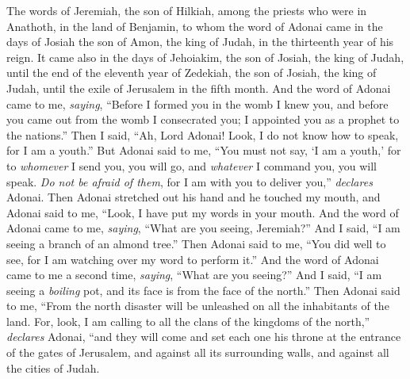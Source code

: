 
\begin{biblechapter} %
 The words of Jeremiah, the son of Hilkiah, among the priests who were in Anathoth, in the land of Benjamin,
\verse to whom the word of Adonai came in the days of Josiah the son of Amon, the king of Judah, in the thirteenth year of his reign.
\verse It came also in the days of Jehoiakim, the son of Josiah, the king of Judah, until the end of the eleventh year of Zedekiah, the son of Josiah, the king of Judah, until the exile of Jerusalem in the fifth month.
\verse And the word of Adonai came to me, \textit{saying},
\verse “Before I formed you in the womb I knew you, 
and before you came out from the womb I consecrated you; 
I appointed you as a prophet to the nations.”
\verse Then I said, “Ah, Lord Adonai! Look, I do not know how to speak, for I am a youth.”
\verse But Adonai said to me, “You must not say, ‘I am a youth,’ for to \textit{whomever} I send you, you will go, and \textit{whatever} I command you, you will speak.
\verse \textit{Do not be afraid of them}, for I am with you to deliver you,” \textit{declares} Adonai.
\verse Then Adonai stretched out his hand and he touched my mouth, and Adonai said to me,
\verse “Look, I have put my words in your mouth.
 And the word of Adonai came to me, \textit{saying}, “What are you seeing, Jeremiah?” And I said, “I am seeing a branch of an almond tree.”
\verse Then Adonai said to me, “You did well to see, for I am watching over my word to perform it.”
\verse And the word of Adonai came to me a second time, \textit{saying}, “What are you seeing?” And I said, “I am seeing a \textit{boiling} pot, and its face is from the face of the north.”
\verse Then Adonai said to me, “From the north disaster will be unleashed on all the inhabitants of the land.
\verse For, look, I am calling to all the clans of the kingdoms of the north,” \textit{declares} Adonai, “and they will come and set each one his throne at the entrance of the gates of Jerusalem, and against all its surrounding walls, and against all the cities of Judah.

\end{biblechapter}
